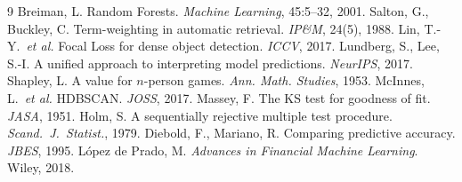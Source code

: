 \documentclass[11pt,a4paper]{article}
\begin{document}
\begin{thebibliography}{9}
 Breiman, L. Random Forests. \emph{Machine Learning}, 45:5--32, 2001.
 Salton, G., Buckley, C. Term-weighting in automatic retrieval. \emph{IP\&M}, 24(5), 1988.
 Lin, T.-Y.\ \emph{et al.} Focal Loss for dense object detection. \emph{ICCV}, 2017.
 Lundberg, S., Lee, S.-I. A unified approach to interpreting model predictions. \emph{NeurIPS}, 2017.
 Shapley, L. A value for $n$-person games. \emph{Ann. Math. Studies}, 1953.
 McInnes, L.\ \emph{et al.} HDBSCAN. \emph{JOSS}, 2017.
 Massey, F. The KS test for goodness of fit. \emph{JASA}, 1951.
 Holm, S. A sequentially rejective multiple test procedure. \emph{Scand.\ J.\ Statist.}, 1979.
 Diebold, F., Mariano, R. Comparing predictive accuracy. \emph{JBES}, 1995.
 López de Prado, M. \emph{Advances in Financial Machine Learning}. Wiley, 2018.
\end{thebibliography}
\end{document}
